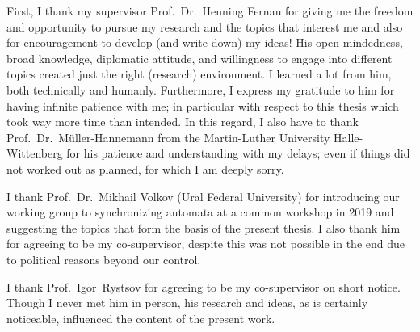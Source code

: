 











First, I thank my supervisor Prof.~Dr.~Henning Fernau for giving me
the freedom and opportunity to pursue my research and the topics that interest me and also for encouragement to develop (and write down) my
ideas!
His open-mindedness, broad knowledge, diplomatic attitude, and willingness to engage into different topics
created just the right (research) environment. I learned a lot from him, both technically and humanly.
Furthermore, I express my gratitude to him for having infinite patience with me; in particular with respect
to this thesis which took way more time than intended. In this regard, I also have to thank Prof.~Dr.~Müller-Hannemann
from the Martin-Luther University Halle-Wittenberg for his patience and understanding with my delays; 
even if things did not worked out as planned, for which I am deeply sorry.



I thank Prof.~Dr.~Mikhail Volkov (Ural Federal University)
for introducing our working group to synchronizing automata at a common workshop in 2019
and suggesting the topics that form the basis
of the present thesis. I also thank him for agreeing to be my co-supervisor, despite this
was not possible in the end due to political reasons beyond our control.


I thank Prof.~Igor~Rystsov for agreeing to be my co-supervisor on short notice.
Though I never met him in person, his research and ideas, as is certainly noticeable,
influenced the content of the present work.

